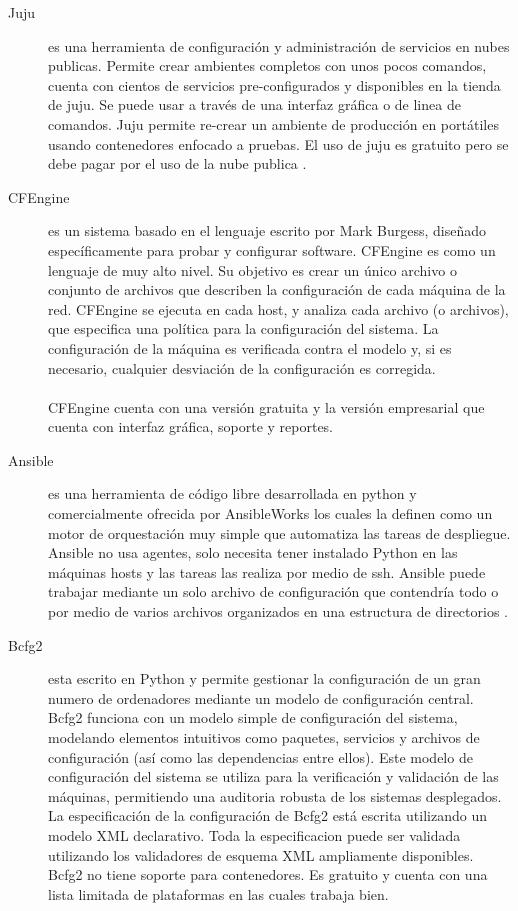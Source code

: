 \begin{description}
\item [Juju]
 es una herramienta de configuración y administración de servicios en nubes publicas. Permite crear ambientes completos con unos pocos comandos, cuenta con cientos de servicios pre-configurados y disponibles en la tienda de juju. Se puede usar a través de una interfaz gráfica o de linea de comandos. Juju permite re-crear un ambiente de producción en portátiles usando contenedores enfocado a pruebas. El uso de juju es gratuito pero se debe pagar por el uso de la nube publica \cite{juju16}.

\item [CFEngine]
es un sistema basado en el lenguaje escrito por Mark Burgess, diseñado específicamente para probar y configurar software. CFEngine es como un lenguaje de muy alto nivel. Su objetivo es crear un único archivo o conjunto de archivos que describen la configuración de cada máquina de la red. CFEngine se ejecuta en cada host, y analiza cada archivo (o archivos), que especifica una política para la configuración del sistema. La configuración de la máquina es verificada contra el modelo y, si es necesario, cualquier desviación de la configuración es corregida. \cite{cfengine15}\\
\\
CFEngine cuenta con una versión gratuita y la versión empresarial que cuenta con interfaz gráfica, soporte y reportes.

\item [Ansible]
es una herramienta de código libre desarrollada en python y comercialmente ofrecida por AnsibleWorks los cuales la definen como un motor de orquestación muy simple que automatiza las tareas de despliegue. Ansible no usa agentes, solo necesita tener instalado Python en las máquinas hosts y las tareas las realiza por medio de ssh. Ansible puede trabajar mediante un solo archivo de configuración que contendría todo o por medio de varios archivos organizados en una estructura de directorios \cite{ans16}. 

\item [Bcfg2]
esta escrito en Python y permite gestionar la configuración de un gran numero de ordenadores mediante un modelo de configuración central. Bcfg2 funciona con un modelo simple de configuración del sistema, modelando elementos intuitivos como paquetes, servicios y archivos de configuración (así como las dependencias entre ellos). Este modelo de configuración del sistema se utiliza para la verificación  y validación de las máquinas, permitiendo una auditoria robusta de los sistemas desplegados. La especificación de la configuración de Bcfg2 está escrita utilizando un modelo XML declarativo. Toda la especificacion puede ser validada utilizando los validadores de esquema XML ampliamente disponibles. Bcfg2 no tiene soporte para contenedores. Es gratuito y cuenta con una lista limitada de plataformas en las cuales trabaja bien.\cite{bdfg215}


\end{description}
